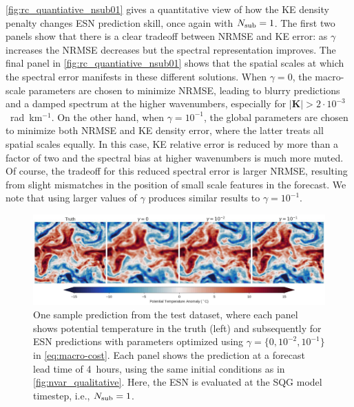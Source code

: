 \cref{fig:rc_quantiative_nsub01} gives a quantitative view of how the KE density
penalty changes ESN prediction skill, once again with $N_\text{sub}=1$.
The first two panels show that there is a clear tradeoff between NRMSE and KE error:
as $\gamma$ increases the NRMSE decreases but the spectral representation improves.
The final panel in \cref{fig:rc_quantiative_nsub01}
shows that the spatial scales at which the spectral error manifests in these
different solutions.
When $\gamma=0$, the macro-scale parameters are chosen to minimize NRMSE, leading
to blurry predictions and a damped spectrum at the higher wavenumbers,
especially for $|\mathbf{K}| > 2\cdot10^{-3}$~rad~km$^{-1}$.
On the other hand, when $\gamma = 10^{-1}$, the global parameters are chosen to
minimize both NRMSE and KE density error, where the latter treats all spatial
scales equally.
In this case, KE relative error is reduced by more than a factor of two and the
spectral bias at higher wavenumbers is much more muted.
Of course, the tradeoff for this reduced spectral error is larger NRMSE, resulting
from slight mismatches in the position of small scale features in the forecast.
We note that using larger values of $\gamma$ produces similar results to
$\gamma=10^{-1}$.


\begin{figure}
    \centering
    \includegraphics[width=\textwidth]{../figures/rc_qualitative_gamma.jpg}
    \caption{
        One sample prediction from the test dataset, where each panel shows
        potential temperature in the truth (left) and subsequently for
        ESN predictions with parameters optimized using
        $\gamma=\{0, 10^{-2}, 10^{-1}\}$ in \cref{eq:macro-cost}.
        Each panel shows the prediction at a forecast lead time of 4~hours,
        using the same initial conditions as in \cref{fig:nvar_qualitative}.
        Here, the ESN is evaluated at the SQG model timestep, i.e., $N_\text{sub}=1$.
    }
    \label{fig:rc_qualitative_nsub01}
\end{figure}

